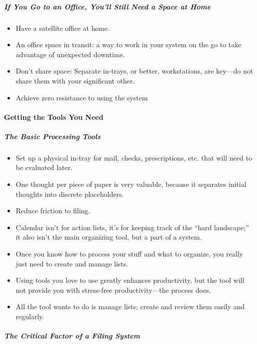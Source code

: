 \documentclass{article}
\begin{document}
\subparagraph{If You Go to an Office, You'll Still Need a Space at Home}

\begin{itemize}
  \item Have a satellite office at home.
  \item An office space in transit: a way to work in your system on the go to take advantage of unexpected downtime.
  \item Don't share space: Separate in-trays, or better, workstations, are key---do not share them with your significant other.
  \item Achieve zero resistance to using the system
\end{itemize}

\paragraph{Getting the Tools You Need}

\subparagraph{The Basic Processing Tools}

\begin{itemize}
  \item Set up a physical in-tray for mail, checks, prescriptions, etc. that will need to be evaluated later.
  \item One thought per piece of paper is very valuable, because it separates initial thoughts into discrete placeholders.
  \item Reduce friction to filing.
  \item Calendar isn't for action lists, it's for keeping track of the ``hard landscape;'' it also isn't the main organizing tool, but a part of a system.
  \item Once you know how to process your stuff and what to organize, you really just need to create and manage lists.
  \item Using tools you love to use greatly enhances productivity, but the tool will not provide you with stress-free productivity---the process does.
  \item All the tool wants to do is manage lists; create and review them easily and regularly.
\end{itemize}

\subparagraph{The Critical Factor of a Filing System}
\end{document}
